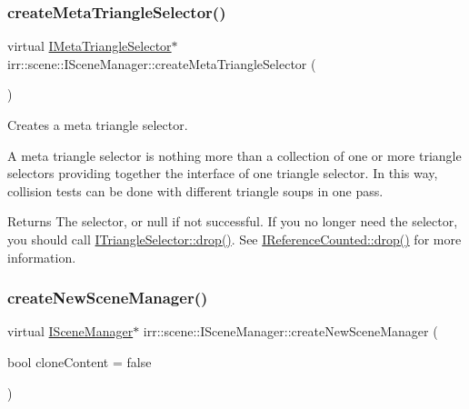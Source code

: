 \subsubsection{\texorpdfstring{create\+Meta\+Triangle\+Selector()}{createMetaTriangleSelector()}\hspace{0.1cm}{\footnotesize\ttfamily [2/2]}}
{\footnotesize\ttfamily virtual \hyperlink{classirr_1_1scene_1_1IMetaTriangleSelector}{I\+Meta\+Triangle\+Selector}$\ast$ irr\+::scene\+::\+I\+Scene\+Manager\+::create\+Meta\+Triangle\+Selector (\begin{DoxyParamCaption}{ }\end{DoxyParamCaption})\hspace{0.3cm}{\ttfamily [pure virtual]}}



Creates a meta triangle selector. 

A meta triangle selector is nothing more than a collection of one or more triangle selectors providing together the interface of one triangle selector. In this way, collision tests can be done with different triangle soups in one pass. \begin{DoxyReturn}{Returns}
The selector, or null if not successful. If you no longer need the selector, you should call \hyperlink{classirr_1_1IReferenceCounted_a03856a09355b89d178090c4a5f738543}{I\+Triangle\+Selector\+::drop()}. See \hyperlink{classirr_1_1IReferenceCounted_a03856a09355b89d178090c4a5f738543}{I\+Reference\+Counted\+::drop()} for more information. 
\end{DoxyReturn}
\mbox{\label{classirr_1_1scene_1_1ISceneManager_a94805dd4eca41ccef9607aefe669aed9}} 
\subsubsection{\texorpdfstring{create\+New\+Scene\+Manager()}{createNewSceneManager()}\hspace{0.1cm}{\footnotesize\ttfamily [1/2]}}
{\footnotesize\ttfamily virtual \hyperlink{classirr_1_1scene_1_1ISceneManager}{I\+Scene\+Manager}$\ast$ irr\+::scene\+::\+I\+Scene\+Manager\+::create\+New\+Scene\+Manager (\begin{DoxyParamCaption}\item[{bool}]{clone\+Content = {\ttfamily false} }\end{DoxyParamCaption})\hspace{0.3cm}{\ttfamily [pure virtual]}}



